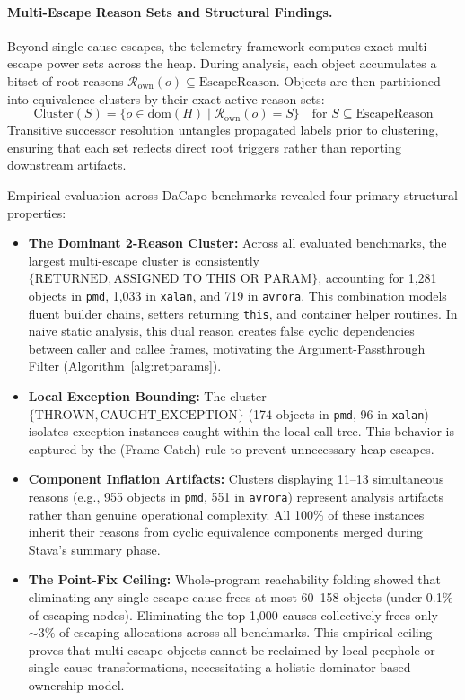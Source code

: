 \documentclass[12pt,a4paper]{article}
\begin{document}
\paragraph{Multi-Escape Reason Sets and Structural Findings.}
Beyond single-cause escapes, the telemetry framework computes exact multi-escape power sets across the heap. During analysis, each object accumulates a bitset of root reasons $\mathcal{R}_{\text{own}}(o) \subseteq \text{EscapeReason}$. Objects are then partitioned into equivalence clusters by their exact active reason sets:
\[
\text{Cluster}(S) = \{ o \in \text{dom}(H) \mid \mathcal{R}_{\text{own}}(o) = S \} \quad \text{for } S \subseteq \text{EscapeReason}
\]
Transitive successor resolution untangles propagated labels prior to clustering, ensuring that each set reflects direct root triggers rather than reporting downstream artifacts.

Empirical evaluation across DaCapo benchmarks revealed four primary structural properties:
\begin{itemize}[leftmargin=*]
  \item \textbf{The Dominant 2-Reason Cluster:} Across all evaluated benchmarks, the largest multi-escape cluster is consistently $\{\text{RETURNED}, \text{ASSIGNED\_TO\_THIS\_OR\_PARAM}\}$, accounting for 1,281 objects in \texttt{pmd}, 1,033 in \texttt{xalan}, and 719 in \texttt{avrora}. This combination models fluent builder chains, setters returning \texttt{this}, and container helper routines. In naive static analysis, this dual reason creates false cyclic dependencies between caller and callee frames, motivating the Argument-Passthrough Filter (Algorithm~\ref{alg:retparams}).
  \item \textbf{Local Exception Bounding:} The cluster $\{\text{THROWN}, \text{CAUGHT\_EXCEPTION}\}$ (174 objects in \texttt{pmd}, 96 in \texttt{xalan}) isolates exception instances caught within the local call tree. This behavior is captured by the (Frame-Catch) rule to prevent unnecessary heap escapes.
  \item \textbf{Component Inflation Artifacts:} Clusters displaying 11--13 simultaneous reasons (e.g., 955 objects in \texttt{pmd}, 551 in \texttt{avrora}) represent analysis artifacts rather than genuine operational complexity. All 100\% of these instances inherit their reasons from cyclic equivalence components merged during Stava's summary phase.
  \item \textbf{The Point-Fix Ceiling:} Whole-program reachability folding showed that eliminating any single escape cause frees at most 60--158 objects (under 0.1\% of escaping nodes). Eliminating the top 1,000 causes collectively frees only ${\sim}3\%$ of escaping allocations across all benchmarks. This empirical ceiling proves that multi-escape objects cannot be reclaimed by local peephole or single-cause transformations, necessitating a holistic dominator-based ownership model.
\end{itemize}
\end{document}
